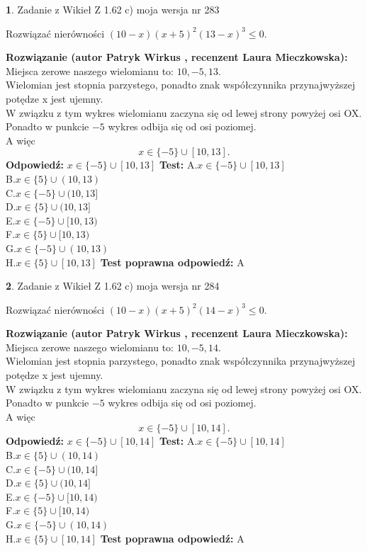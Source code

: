 \documentclass[12pt, a4paper]{article}
\theoremstyle{definition} %
\newtheorem{zad}{}
\newcommand{\zadStart}[1]{\begin{zad}#1\newline}
\newcommand{\zadStop}{\end{zad}}
\newcommand{\rozwStart}[2]{\noindent \textbf{Rozwiązanie (autor #1 , recenzent #2): }\newline}
\newcommand{\rozwStop}{\newline}
\newcommand{\odpStart}{\noindent \textbf{Odpowiedź:}\newline}
\newcommand{\odpStop}{\newline}
\newcommand{\testStart}{\noindent \textbf{Test:}\newline}
\newcommand{\testStop}{\newline}
\newcommand{\kluczStart}{\noindent \textbf{Test poprawna odpowiedź:}\newline}
\newcommand{\kluczStop}{\newline}
\begin{document}
\zadStart{Zadanie z Wikieł Z 1.62 c) moja wersja nr 283}

Rozwiązać nierówności $(10-x)(x+5)^{2}(13-x)^{3}\le0$.
\zadStop
\rozwStart{Patryk Wirkus}{Laura Mieczkowska}
Miejsca zerowe naszego wielomianu to: $10, -5, 13$.\\
Wielomian jest stopnia parzystego, ponadto znak współczynnika przy\linebreak najwyższej potędze x jest ujemny.\\ W związku z tym wykres wielomianu zaczyna się od lewej strony powyżej osi OX.\\
Ponadto w punkcie $-5$ wykres odbija się od osi poziomej.\\
A więc $$x \in \{-5\} \cup [10,13].$$
\rozwStop
\odpStart
$x \in \{-5\} \cup [10,13]$
\odpStop
\testStart
A.$x \in \{-5\} \cup [10,13]$\\
B.$x \in \{5\} \cup (10,13)$\\
C.$x \in \{-5\} \cup (10,13]$\\
D.$x \in \{5\} \cup (10,13]$\\
E.$x \in \{-5\} \cup [10,13)$\\
F.$x \in \{5\} \cup [10,13)$\\
G.$x \in \{-5\} \cup (10,13)$\\
H.$x \in \{5\} \cup [10,13]$
\testStop
\kluczStart
A
\kluczStop



\zadStart{Zadanie z Wikieł Z 1.62 c) moja wersja nr 284}

Rozwiązać nierówności $(10-x)(x+5)^{2}(14-x)^{3}\le0$.
\zadStop
\rozwStart{Patryk Wirkus}{Laura Mieczkowska}
Miejsca zerowe naszego wielomianu to: $10, -5, 14$.\\
Wielomian jest stopnia parzystego, ponadto znak współczynnika przy\linebreak najwyższej potędze x jest ujemny.\\ W związku z tym wykres wielomianu zaczyna się od lewej strony powyżej osi OX.\\
Ponadto w punkcie $-5$ wykres odbija się od osi poziomej.\\
A więc $$x \in \{-5\} \cup [10,14].$$
\rozwStop
\odpStart
$x \in \{-5\} \cup [10,14]$
\odpStop
\testStart
A.$x \in \{-5\} \cup [10,14]$\\
B.$x \in \{5\} \cup (10,14)$\\
C.$x \in \{-5\} \cup (10,14]$\\
D.$x \in \{5\} \cup (10,14]$\\
E.$x \in \{-5\} \cup [10,14)$\\
F.$x \in \{5\} \cup [10,14)$\\
G.$x \in \{-5\} \cup (10,14)$\\
H.$x \in \{5\} \cup [10,14]$
\testStop
\kluczStart
A
\kluczStop
\end{document}
